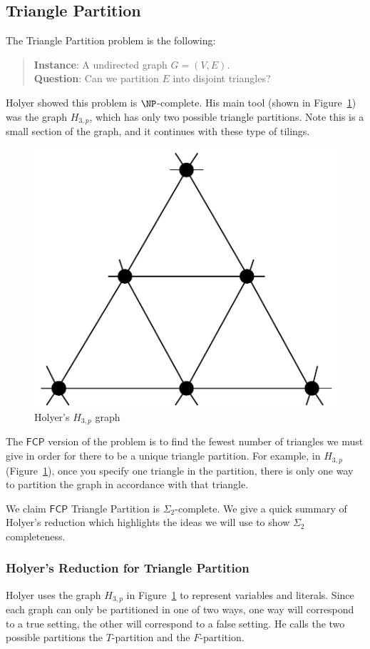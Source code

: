\documentclass[runningheads,a4paper]{llncs}
\begin{document}
\subsection{Triangle Partition}

The Triangle Partition problem is the following:
\begin{quote}
\textbf{Instance}: A undirected graph $G = (V, E)$.\\
\textbf{Question}: Can we partition $E$ into disjoint triangles?
\end{quote}

Holyer \cite{holyer1981np} showed this problem is $\NP$-complete. His main tool (shown in Figure~\ref{fig:holyergraph}) was the graph $H_{3, p}$, which has only two possible triangle partitions. Note this is a small section of the graph, and it continues with these type of tilings.
\begin{figure}
\label{fig:holyergraph}
\centering
\includegraphics[width=0.4\linewidth]{Holyergraph.pdf}
\caption{Holyer's $H_{3,p}$ graph}
\end{figure}

The $\mathsf{FCP}$ version of the problem is to find the fewest number of triangles we must give in order for there to be a unique triangle partition. For example, in $H_{3,p}$ (Figure~\ref{fig:holyergraph}), once you specify one triangle in the partition, there is only one way to partition the graph in accordance with that triangle.

We claim $\mathsf{FCP}$ Triangle Partition is $\Sigma_2$-complete. We give a quick summary of Holyer's reduction which highlights the ideas we will use to show $\Sigma_2$ completeness. 

\subsubsection{Holyer's Reduction for Triangle Partition}
%
%
% 
Holyer uses the graph $H_{3,p}$ in Figure~\ref{fig:holyergraph} to represent variables and literals. Since each graph can only be partitioned in one of two ways, one way will correspond to a true setting, the other will correspond to a false setting. He calls the two possible partitions the $T$-partition and the $F$-partition. 
\end{document}
